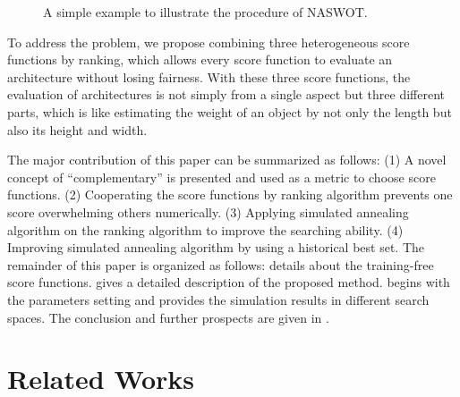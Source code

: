 \documentclass[sigconf]{acmart}
\begin{document}
    \begin{figure*}[b]
        \vspace{-\baselineskip}
        \caption{A simple example to illustrate the procedure of NASWOT.}
        \label{fig:naswot}
        \centering
        \vspace{-\baselineskip}
    \end{figure*}
    To address the problem, we propose combining three heterogeneous 
    score functions by ranking, which allows every score function to 
    evaluate an architecture without losing fairness. 
    With these three score functions, the evaluation of 
    architectures is not simply from a single aspect but three different 
    parts, which is like estimating the weight of an object by not only 
    the length but also its height and width. 

    The major contribution of this paper can be summarized as follows: 
    (1) A novel concept of ``complementary'' is presented and used as 
    a metric to choose score functions. 
    (2) Cooperating the score functions by ranking algorithm prevents 
    one score overwhelming others numerically. 
    (3) Applying simulated annealing algorithm on the ranking algorithm 
    to improve the searching ability. 
    (4) Improving simulated annealing algorithm by using a historical 
    best set. 
    The remainder of this paper is organized as follows: 
     details about the training-free 
    score functions. 
     gives a detailed description of the proposed method. 
     begins with the parameters setting and provides the 
    simulation results in different search spaces. 
    The conclusion and further prospects are given in .

    \section{Related Works}
    \label{sec:related_work}
\end{document}
